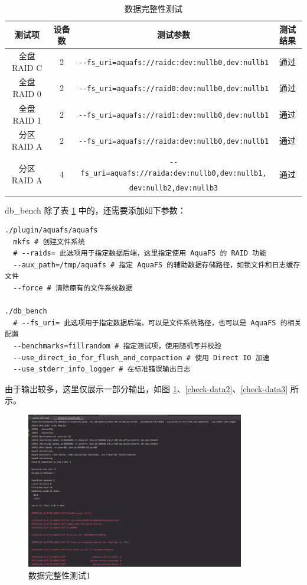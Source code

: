 \begin{table}[htbp]
  \centering
  \caption{数据完整性测试}
  \label{test-data}
  \begin{tabular}{cccc}
    \hline
    \textbf{测试项} & \textbf{设备数} & \textbf{测试参数} & \textbf{测试结果} \\
    \hline
    全盘 RAID C & 2 & \verb|--fs_uri=aquafs://raidc:dev:nullb0,dev:nullb1| & 通过 \\
    全盘 RAID 0 & 2 & \verb|--fs_uri=aquafs://raid0:dev:nullb0,dev:nullb1| & 通过 \\
    全盘 RAID 1 & 2 & \verb|--fs_uri=aquafs://raid1:dev:nullb0,dev:nullb1| & 通过 \\
    分区 RAID A & 2 & \verb|--fs_uri=aquafs://raida:dev:nullb0,dev:nullb1| & 通过 \\
    \multirow{2}{*}{分区 RAID A} & \multirow{2}{*}{4} & \verb|--fs_uri=aquafs://raida:dev:nullb0,dev:nullb1,| & \multirow{2}{*}{通过} \\
    & & \verb|dev:nullb2,dev:nullb3| & \\
    \hline
  \end{tabular}
\end{table}

db\_bench 除了表 \ref{test-data} 中的，还需要添加如下参数：

\begin{lstlisting}
./plugin/aquafs/aquafs
  mkfs # 创建文件系统
  # --raids= 此选项用于指定数据后端，这里指定使用 AquaFS 的 RAID 功能
  --aux_path=/tmp/aquafs # 指定 AquaFS 的辅助数据存储路径，如锁文件和日志缓存文件
  --force # 清除原有的文件系统数据

./db_bench 
  # --fs_uri= 此选项用于指定数据后端，可以是文件系统路径，也可以是 AquaFS 的相关配置
  --benchmarks=fillrandom # 指定测试项，使用随机写并校验
  --use_direct_io_for_flush_and_compaction # 使用 Direct IO 加速
  --use_stderr_info_logger # 在标准错误输出日志
\end{lstlisting}

由于输出较多，这里仅展示一部分输出，如图 \ref{check-data1}、\ref{check-data2}、\ref{check-data3} 所示。

\begin{figure}[htbp]
  \centering
  \includegraphics[width=0.85\textwidth]{fig/raid-data-check1.png}
  \caption{ 数据完整性测试1 }
  \label{check-data1}
\end{figure}


